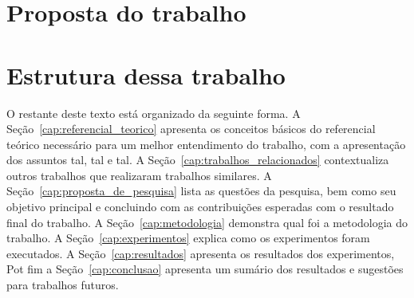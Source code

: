 \lipsum[17-18]

\section{Proposta do trabalho}

\lipsum[19-21]

\section{Estrutura dessa trabalho}

O restante deste texto está organizado da seguinte forma. A Seção~\ref{cap:referencial_teorico} apresenta os conceitos básicos do referencial teórico necessário para um melhor entendimento do trabalho, com a apresentação dos assuntos tal, tal e tal. A Seção~\ref{cap:trabalhos_relacionados} contextualiza outros trabalhos que realizaram trabalhos similares. A Seção~\ref{cap:proposta_de_pesquisa} lista as questões da pesquisa, bem como seu objetivo principal e concluindo com as contribuições esperadas com o resultado final do trabalho. A Seção~\ref{cap:metodologia} demonstra qual foi a metodologia do trabalho. A Seção~\ref{cap:experimentos} explica como os experimentos foram executados. A Seção~\ref{cap:resultados} apresenta os resultados dos experimentos, Pot fim a Seção~\ref{cap:conclusao} apresenta um sumário dos resultados e sugestões para trabalhos futuros. 